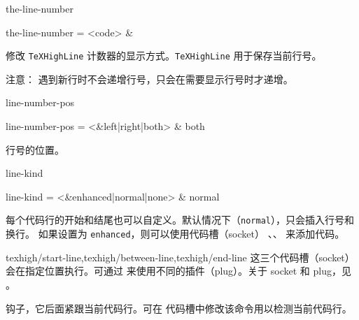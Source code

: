 \documentclass[class=article,openany]{cusdoc}[2025/10/10]
\begin{document}
\begin{keyval}[path=high]{the-line-number}
  \begin{syntax}
    the-line-number = <code> & 
  \end{syntax}
修改 \texttt{TeXHighLine} 计数器的显示方式。\texttt{TeXHighLine} 用于保存当前行号。

注意： 遇到新行时不会递增行号，只会在需要显示行号时才递增。
\end{keyval}

\begin{keyval}[path=high]{line-number-pos}
  \begin{syntax}
    line-number-pos = <&left|right|both> & both
  \end{syntax}
行号的位置。
\end{keyval}

\begin{keyval}[path=high]{line-kind}
  \begin{syntax}
    line-kind = <&enhanced|normal|none> & normal
  \end{syntax}
每个代码行的开始和结尾也可以自定义。默认情况下（\texttt{normal}），只会插入行号和换行。
如果设置为 \texttt{enhanced}，则可以使用代码槽（socket）
、、 来添加代码。
\end{keyval}

\begin{function}[module=socket point,type=socket point]{texhigh/start-line,texhigh/between-line,texhigh/end-line}
这三个代码槽（socket）会在指定位置执行。可通过  来使用不同的插件（plug）。关于 socket 和 plug，见 。
\end{function}

\begin{function}{\texhigh@start@line}
钩子，它后面紧跟当前代码行。可在  代码槽中修改该命令用以检测当前代码行。
\end{function}
\end{document}

